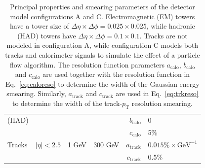 \documentclass[11pt,letterpaper]{article}
\newcommand{\GeV}{\text{GeV}}
\newcommand{\pt}{\ensuremath{p_{\text{T}}}}
\newcommand{\acalo}{\ensuremath{a_{\text{calo}}}}
\newcommand{\bcalo}{\ensuremath{b_{\text{calo}}}}
\newcommand{\ccalo}{\ensuremath{c_{\text{calo}}}}
\newcommand{\atrk}{\ensuremath{a_{\text{track}}}}
\newcommand{\ctrk}{\ensuremath{c_{\text{track}}}}
\begin{document}
\begin{table}
\begin{tabular}{|l|c|c|c|r@{\ =\ }l|}
(HAD)      &                &         &           & \bcalo & 0                                        \\
           &                &         &           & \ccalo & 5\%                                      \\
Tracks     & $|\eta| < 2.5$ &  1 GeV  &  300 GeV  & \atrk  & $0.015\%\times\GeV^{-1}$                  \\
           &                &         &           & \ctrk & 0.5\%                                     \\
\hline
\end{tabular}
\caption{Principal properties and smearing parameters of the detector model configurations A and C. Electromagnetic (EM) towers have a tower size of $\Delta\eta\times\Delta\phi = 0.025\times0.025$, while hadronic (HAD) towers have $\Delta\eta\times\Delta\phi = 0.1\times0.1$. Tracks are not modeled in configuration A, while configuration C models both tracks and calorimeter signals to simulate the effect of a particle flow algorithm. The resolution function parameters \acalo, \bcalo{} and \ccalo{} are used together with the resolution function in Eq.~\ref{eq:caloreso} to determine the width of the Gaussian energy smearing.
Similarly, \atrk{} and \ctrk{} are used in Eq.~\ref{eq:trkreso} to determine the width of the track-\pt{} resolution smearing.}
\label{tab:detmodel}
\end{table}
\end{document}
